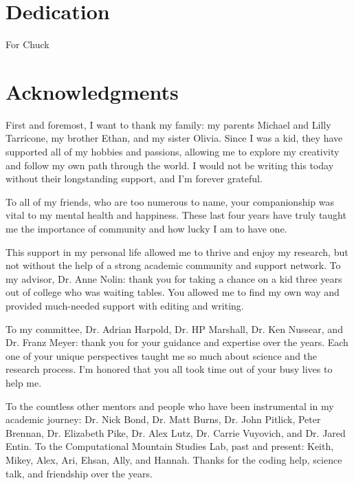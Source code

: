 \documentclass[11pt, oneside, openany]{scrbook}
\begin{document}
\section*{Dedication}
\begin{center}
  \vfill
  For Chuck
  \vfill
  \null
\end{center}
%


\newpage
{}
\section*{Acknowledgments}

First and foremost, I want to thank my family: my parents Michael and Lilly Tarricone, my brother Ethan, and my sister Olivia. Since I was a kid, they have supported all of my hobbies and passions, allowing me to explore my creativity and follow my own path through the world. I would not be writing this today without their longstanding support, and I’m forever grateful.

To all of my friends, who are too numerous to name, your companionship was vital to my mental health and happiness. These last four years have truly taught me the importance of community and how lucky I am to have one.

This support in my personal life allowed me to thrive and enjoy my research, but not without the help of a strong academic community and support network. To my advisor, Dr. Anne Nolin: thank you for taking a chance on a kid three years out of college who was waiting tables. You allowed me to find my own way and provided much-needed support with editing and writing.

To my committee, Dr. Adrian Harpold, Dr. HP Marshall, Dr. Ken Nussear, and Dr. Franz Meyer: thank you for your guidance and expertise over the years. Each one of your unique perspectives taught me so much about science and the research process. I'm honored that you all took time out of your busy lives to help me.

To the countless other mentors and people who have been instrumental in my academic journey: Dr. Nick Bond, Dr. Matt Burns, Dr. John Pitlick, Peter Brennan, Dr. Elizabeth Pike, Dr. Alex Lutz, Dr. Carrie Vuyovich, and Dr. Jared Entin. To the Computational Mountain Studies Lab, past and present: Keith, Mikey, Alex, Ari, Ehsan, Ally, and Hannah. Thanks for the coding help, science talk, and friendship over the years.


\setcounter{tocdepth}{1}
\tableofcontents

\listoftables

\listoffigures
\mainmatter





\backmatter
\end{document}
